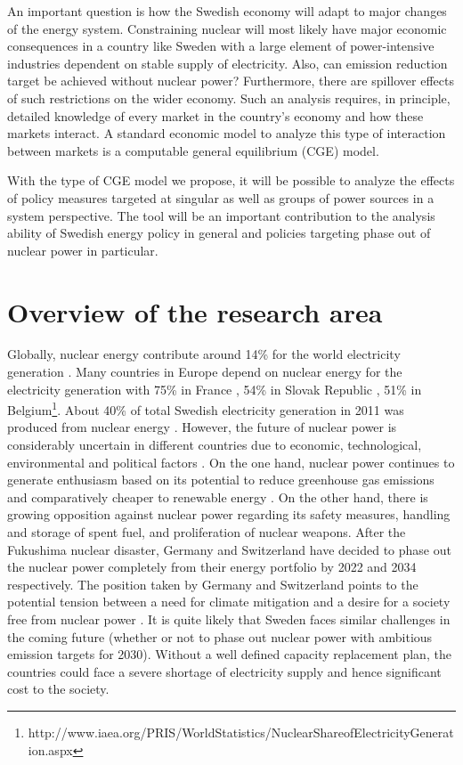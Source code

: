 An important question is how the Swedish economy will adapt to major changes of the energy system. Constraining nuclear will most likely have major economic consequences in a country like Sweden with a large element of power-intensive industries dependent on stable supply of electricity. Also, can emission reduction target be achieved without nuclear power? Furthermore, there are spillover effects of such restrictions on the wider economy. Such an analysis requires, in principle, detailed knowledge of every market in the country's economy and how these markets interact. A standard economic model to analyze this type of interaction between markets is a computable general equilibrium (CGE) model.

With the type of CGE model we propose, it will be possible to analyze the effects of policy measures targeted at singular as well as groups of power sources in a system perspective. The tool will be an important contribution to the analysis ability of Swedish energy policy in general and policies targeting phase out of nuclear power in particular.

\section{Overview of the research area}
Globally, nuclear energy contribute around 14\% for the world electricity generation \citep{OECD2012}. Many countries in Europe depend on nuclear energy for the electricity generation with 75\% in France , 54\% in Slovak Republic , 51\% in Belgium\footnote{http://www.iaea.org/PRIS/WorldStatistics/NuclearShareofElectricityGeneration.aspx}. About 40\% of total Swedish electricity generation in 2011 was produced from nuclear energy \citep{SEA2012}. However, the future of nuclear power is considerably uncertain in different countries due to economic, technological, environmental and political factors \citep{Joskow2012}. On the one hand, nuclear power continues to generate enthusiasm based on its potential to reduce greenhouse gas emissions and comparatively cheaper to renewable energy \citep{Davis2012, Renssen2013}. On the other hand, there is growing opposition against nuclear power regarding its safety measures, handling and storage of spent fuel, and proliferation of nuclear weapons. After the Fukushima nuclear disaster, Germany and Switzerland have decided to phase out the nuclear power completely from their energy portfolio by  2022 and 2034 respectively. The position taken by Germany and Switzerland points to the potential tension between a need for climate mitigation and a desire for a society free from nuclear power \citep{Glomsrod2013}. It is quite likely that Sweden faces similar challenges in the coming future (whether or not to phase out nuclear power with ambitious emission targets for 2030). Without a well defined capacity replacement plan, the countries could face a severe shortage of electricity supply and hence significant cost to the society.

